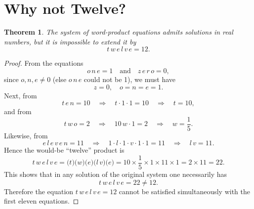 \documentclass[12pt]{article}
\theoremstyle{plain}
\begin{document}
\section*{Why not Twelve?}

\newtheorem*{theorem}{Theorem}

\begin{theorem}
The system of word-product equations admits solutions in real numbers, but it is \emph{impossible} to extend it by
\[
t\,w\,e\,l\,v\,e = 12.
\]
\end{theorem}

\begin{proof}
From the equations
\[
o\,n\,e = 1
\quad\text{and}\quad
z\,e\,r\,o = 0,
\]
since \(o,n,e\neq0\) (else \(o\,n\,e\) could not be 1), we must have
\[
z = 0,
\quad
o = n = e = 1.
\]
Next, from
\[
t\,e\,n = 10
\quad\Longrightarrow\quad
t \cdot 1 \cdot 1 = 10
\quad\Longrightarrow\quad
t = 10,
\]
and from
\[
t\,w\,o = 2
\quad\Longrightarrow\quad
10 \,w \cdot 1 = 2
\quad\Longrightarrow\quad
w = \frac{1}{5}.
\]
Likewise, from
\[
e\,l\,e\,v\,e\,n = 11
\quad\Longrightarrow\quad
1 \cdot l \cdot 1 \cdot v \cdot 1 \cdot 1 = 11
\quad\Longrightarrow\quad
l\,v = 11.
\]
Hence the would-be “twelve” product is
\[
t \, w \, e \, l \, v \, e
= 
\bigl(t\bigr)\bigl(w\bigr)\bigl(e\bigr)\bigl(l\,v\bigr)\bigl(e\bigr)
=
10 \times \frac15 \times 1 \times 11 \times 1
=
2 \times 11
=
22.
\]
This shows that in any solution of the original system one necessarily has
\[
t\,w\,e\,l\,v\,e = 22 \neq 12.
\]
Therefore the equation \(t\,w\,e\,l\,v\,e = 12\) cannot be satisfied simultaneously
with the first eleven equations.
\end{proof}
\end{document}
